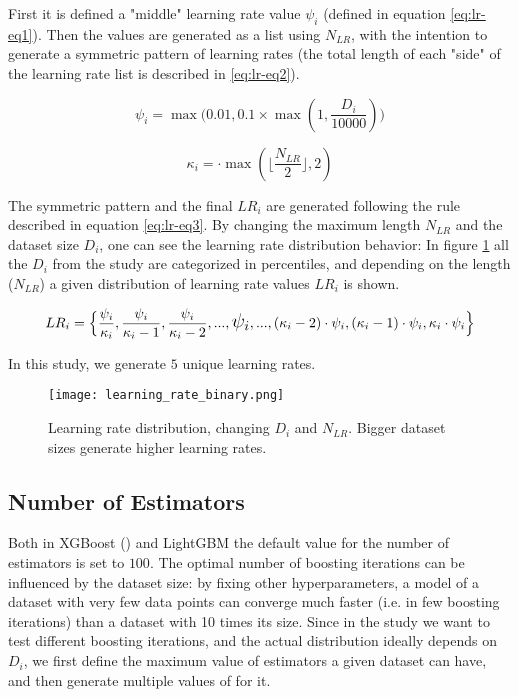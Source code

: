 First it is defined a "middle" learning rate value $\psi_i$ (defined in equation \ref{eq:lr-eq1}). Then the values are generated as a list using $N_{LR}$, with the intention to generate a symmetric pattern of learning rates (the total length of each "side" of the learning rate list is described in \ref{eq:lr-eq2}).

\begin{equation}
    \psi_i = \max\Big(0.01, 0.1 \times \max(1, \frac{D_i}{10000})\Big)
    \label{eq:lr-eq1}
\end{equation}

\begin{equation}
    \kappa_i = \cdot \max\left(\lfloor\frac{N_{LR}}{2}\rfloor, 2\right)
    \label{eq:lr-eq2}
\end{equation}

The symmetric pattern and the final $LR_i$ are generated following the rule described in equation \ref{eq:lr-eq3}. By changing the maximum length $N_{LR}$ and the dataset size $D_i$, one can see the learning rate distribution behavior: In figure \ref{fig:hyperparam-lr1} all the $D_i$ from the study are categorized in percentiles, and depending on the length ($N_{LR}$) a given distribution of learning rate values $LR_i$ is shown.

\begin{equation}
    LR_i = \Big\{\frac{\psi_i}{\kappa_i}, \frac{\psi_i}{\kappa_i - 1}, \frac{\psi_i}{\kappa_i - 2}, ..., \text{\Large $\psi_i$}, ..., (\kappa_i - 2)\cdot\psi_i, (\kappa_i - 1)\cdot\psi_i, \kappa_i\cdot\psi_i\Big\}
    \label{eq:lr-eq3}
\end{equation}

In this study, we generate $5$ unique learning rates.

\begin{figure}[!h]
    \centering
    \texttt{[image: learning\_rate\_binary.png]} 
    \caption{Learning rate distribution, changing $D_i$ and $N_{LR}$. Bigger dataset sizes generate higher learning rates.}
    \label{fig:hyperparam-lr1}
\end{figure}

\subsection{Number of Estimators}

Both in XGBoost () and LightGBM the default value for the number of estimators is set to $100$. The optimal number of boosting iterations can be influenced by the dataset size: by fixing other hyperparameters, a model of a dataset with very few data points can converge much faster (i.e. in few boosting iterations) than a dataset with 10 times its size. Since in the study we want to test different boosting iterations, and the actual distribution ideally depends on $D_i$, we first define the maximum value of estimators a given dataset can have, and then generate multiple values of  for it. 

